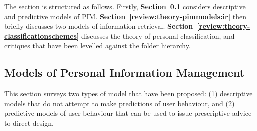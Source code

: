 The section is structured as follows. Firstly, \textbf{Section~\ref{review:theory-pimmodels}} considers descriptive and predictive models of PIM.  \textbf{Section~\ref{review:theory-pimmodels:ir}} then briefly discusses two models of information retrieval. \textbf{Section~\ref{review:theory-classificationschemes}} discusses the theory of personal classification, and critiques that have been levelled against the folder hierarchy.






\subsection{Models of Personal Information Management}
\label{review:theory-pimmodels}
This section surveys two types of model that have been proposed: (1) descriptive models that do not attempt to make predictions of user behaviour, and (2) predictive models of user behaviour that can be used to issue prescriptive advice to direct design.


